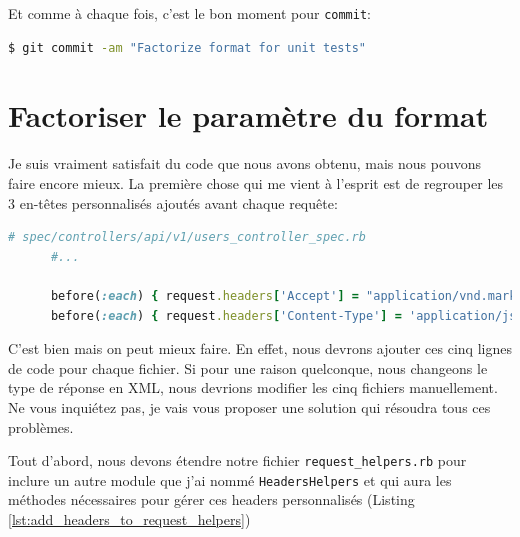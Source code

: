 \documentclass[]{report}
\begin{document}
    Et comme à chaque fois, c'est le bon moment pour \verb|commit|:

    \begin{scriptsize}
      \begin{lstlisting}[language=bash]
      $ git commit -am "Factorize format for unit tests"
      \end{lstlisting}
    \end{scriptsize}

  \section{Factoriser le paramètre du format}

    Je suis vraiment satisfait du code que nous avons obtenu, mais nous pouvons faire encore mieux. La première chose qui me vient à l'esprit est de regrouper les 3 en-têtes personnalisés ajoutés avant chaque requête:

    \begin{scriptsize}
      \begin{lstlisting}[language=ruby]
      # spec/controllers/api/v1/users_controller_spec.rb
      #...

      before(:each) { request.headers['Accept'] = "application/vnd.marketplace.v1, application/json" }
      before(:each) { request.headers['Content-Type'] = 'application/json' }
      \end{lstlisting}
    \end{scriptsize}

    C'est bien mais on peut mieux faire. En effet, nous devrons ajouter ces cinq lignes de code pour chaque fichier. Si pour une raison quelconque, nous changeons le type de réponse en XML, nous devrions modifier les cinq fichiers manuellement. Ne vous inquiétez pas, je vais vous proposer une solution qui résoudra tous ces problèmes.

    Tout d'abord, nous devons étendre notre fichier \verb|request_helpers.rb| pour inclure un autre module que j'ai nommé \verb|HeadersHelpers| et qui aura les méthodes nécessaires pour gérer ces headers personnalisés (Listing \ref{lst:add_headers_to_request_helpers})
\end{document}
